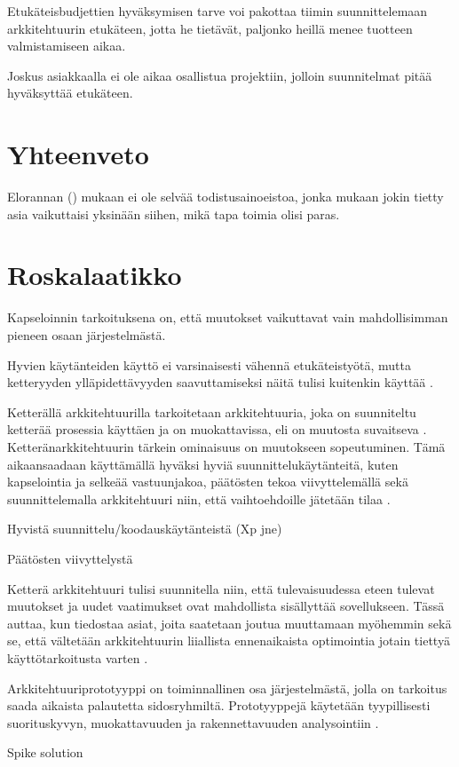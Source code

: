 Etukäteisbudjettien hyväksymisen tarve voi pakottaa tiimin suunnittelemaan arkkitehtuurin etukäteen, jotta he tietävät, paljonko heillä menee tuotteen valmistamiseen aikaa. 

Joskus asiakkaalla ei ole aikaa osallistua projektiin, jolloin suunnitelmat pitää hyväksyttää etukäteen.
\chapter{Yhteenveto}

Elorannan (\citeyear{eloranta2015techniques}) mukaan ei ole selvää todistusainoeistoa, jonka mukaan jokin tietty asia vaikuttaisi yksinään siihen, mikä tapa toimia olisi paras.

\chapter{Roskalaatikko}

Kapseloinnin tarkoituksena on, että muutokset vaikuttavat vain mahdollisimman pieneen osaan järjestelmästä. 

Hyvien käytänteiden käyttö ei varsinaisesti vähennä etukäteistyötä, mutta ketteryyden ylläpidettävyyden saavuttamiseksi näitä tulisi kuitenkin käyttää \citep{waterman_agility_2018_a}. 

Ketterällä arkkitehtuurilla tarkoitetaan arkkitehtuuria, joka on suunniteltu ketterää prosessia käyttäen ja on muokattavissa, eli on muutosta suvaitseva \citep{waterman_how_2015}. Ketteränarkkitehtuurin tärkein ominaisuus on muutokseen sopeutuminen. Tämä aikaansaadaan käyttämällä hyväksi hyviä suunnittelukäytänteitä, kuten kapselointia ja selkeää vastuunjakoa, päätösten tekoa viivyttelemällä sekä suunnittelemalla arkkitehtuuri niin, että vaihtoehdoille jätetään tilaa \citep{waterman_agility_2018_a}. 

Hyvistä suunnittelu/koodauskäytänteistä (Xp jne)

Päätösten viivyttelystä

Ketterä arkkitehtuuri tulisi suunnitella niin, että tulevaisuudessa eteen tulevat muutokset ja uudet vaatimukset ovat mahdollista sisällyttää sovellukseen. Tässä auttaa, kun tiedostaa asiat, joita saatetaan joutua muuttamaan myöhemmin sekä se, että vältetään arkkitehtuurin liiallista ennenaikaista optimointia jotain tiettyä käyttötarkoitusta varten 
\citep{waterman_agility_2018_a}.  

Arkkitehtuuriprototyyppi on toiminnallinen osa järjestelmästä, jolla on tarkoitus saada aikaista palautetta sidosryhmiltä. Prototyyppejä käytetään tyypillisesti suorituskyvyn, muokattavuuden ja rakennettavuuden analysointiin \citep{babar_agile_2013}. 

Spike solution